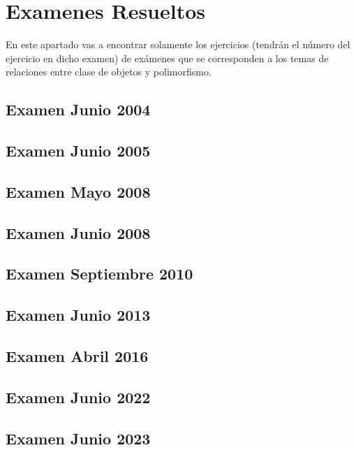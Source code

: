 \chapter{Examenes Resueltos}
En este apartado vas a encontrar solamente los ejercicios (tendrán el número del ejercicio en dicho examen) de exámenes que se corresponden a los temas de relaciones entre clase de objetos y polimorfismo.

\section{Examen Junio 2004}
  

\newpage
\section{Examen Junio 2005}
  
\newpage
\section{Examen Mayo 2008}
  
\newpage
\section{Examen Junio 2008}
  
\newpage
\section{Examen Septiembre 2010}
  
\newpage
\section{Examen Junio 2013}
  
\newpage
\section{Examen Abril 2016}
  
\newpage
\section{Examen Junio 2022}


\newpage
\section{Examen Junio 2023}
  

